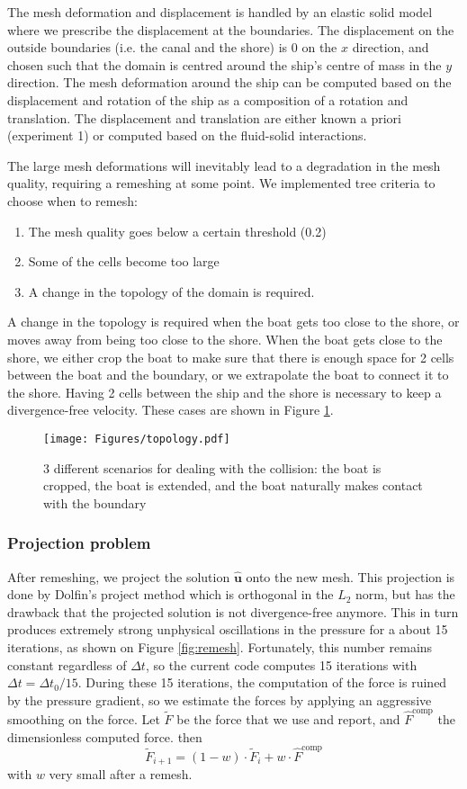 \documentclass[a4paper]{article}
\newcommand{\bhu}{{\bm{\hat{u}}}}
\begin{document}
The mesh deformation and displacement is handled by an elastic solid model where we prescribe the displacement at the boundaries. The displacement on the outside boundaries (i.e. the canal and the shore) is 0 on  the $x$ direction, and chosen such that the domain is centred around the ship's centre of mass in the $y$ direction. The mesh deformation around the ship can be computed based on the displacement and rotation of the ship as a composition of a rotation and translation. The displacement and translation are either known a priori (experiment 1) or computed based on the fluid-solid interactions.


The large mesh deformations will inevitably lead to a degradation in the mesh quality, requiring a remeshing at some point. We implemented tree criteria to choose when to remesh:
\begin{enumerate}
	\item The mesh quality goes below a certain threshold (0.2)
	\item Some of the cells become too large 
	\item A change in the topology of the domain is required.
\end{enumerate}
A change in the topology is required when the boat gets too close to the shore, or moves away from being too close to the shore. When the boat gets close to the shore, we either crop the boat to make sure that there is enough space for 2 cells between the boat and the boundary, or we extrapolate the boat to connect it to the shore. Having 2 cells between the ship and the shore is necessary to keep a divergence-free velocity. These cases are shown in Figure \ref{fig:topology}.

\begin{figure}[hbtb]
	\centering
	\texttt{[image: Figures/topology.pdf]}
	\caption{3 different scenarios for dealing with the collision: the boat is cropped, the boat is extended, and the boat naturally makes contact with the boundary}
	\label{fig:topology}
\end{figure}

\subsubsection{Projection problem}
After remeshing, we project the solution $\bhu$ onto the new mesh. This projection is done by Dolfin's project method which is orthogonal in the $L_2$ norm, but has the drawback that the projected solution is not divergence-free anymore. This in turn produces extremely strong unphysical oscillations in the pressure for a about 15 iterations, as shown on Figure \ref{fig:remesh}. Fortunately, this number remains constant regardless of $\Delta t$, so the current code computes 15 iterations with $\Delta t = \Delta t_0/15$. During these 15 iterations, the computation of the force is ruined by the pressure gradient, so we estimate the forces by applying an aggressive smoothing on the force. Let $\tilde{F}$ be the force that we use and report, and $\hat{F}^\text{comp}$ the dimensionless computed force. then 
\[
	\tilde{F}_{i+1} = (1-w) \cdot \tilde{F}_{i} + w \cdot \hat{F}^\text{comp}
\]
with $w$ very small after a remesh.
\end{document}
